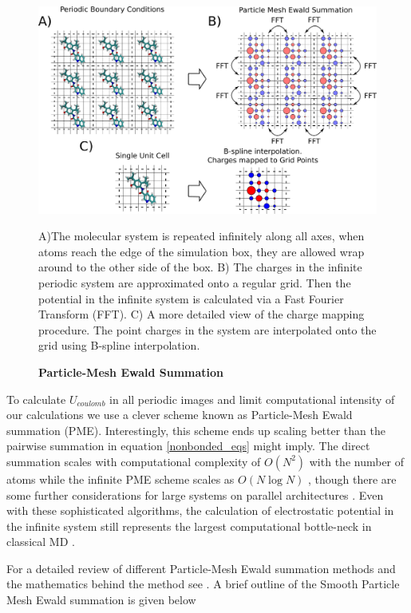 \begin{figure}
	\begin{center}
		\includegraphics[width=\textwidth]{figures/PME_miro.pdf}
	\end{center}
	\captionsetup{singlelinecheck = false, justification=raggedright}
	\caption[Particle Mesh Ewald Summation] {\textbf{Particle-Mesh Ewald Summation}}{A)The molecular system is repeated infinitely along all axes, when atoms reach the edge of the simulation box, they are allowed wrap around to the other side of the box. B) The charges in the infinite periodic system are approximated onto a regular grid. Then the potential in the infinite system is calculated via a Fast Fourier Transform (FFT). C) A more detailed view of the charge mapping procedure. The point charges in the system are interpolated onto the grid using B-spline interpolation. }
	\label{PME_illustration}
\end{figure}

To calculate $U_{coulomb}$ in all periodic images and limit computational intensity of our calculations we use a clever scheme known as Particle-Mesh Ewald summation (PME). Interestingly, this scheme ends up scaling better than the pairwise summation in equation \ref{nonbonded_eqs} might imply. The direct summation scales with computational complexity of $O(N^2)$  with the number of atoms while the infinite PME scheme scales as $O (N\log N)$ \cite{darden1993}, though there are some further considerations for large systems on parallel architectures \cite{hardy2015}. Even with these sophisticated algorithms, the calculation of electrostatic potential in the infinite system still represents the largest computational bottle-neck in classical MD \cite{hardy2015}.

For a detailed review of different Particle-Mesh Ewald summation methods and the mathematics behind the method see \cite{shan2005}. A brief outline of the Smooth Particle Mesh Ewald summation is given below 

